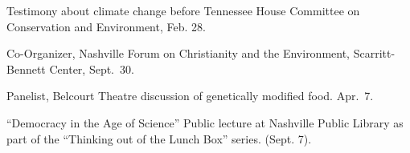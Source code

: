 \item[2008] Testimony about climate change before Tennessee House Committee on
  Conservation and Environment, Feb. 28.
\item[2006] Co-Organizer, Nashville Forum on Christianity and the Environment,
  Scarritt-Bennett Center, Sept.~30.
\item[2006] Panelist, Belcourt Theatre discussion of genetically modified food.
  Apr.~7.
\item[2005] ``Democracy in the Age of Science'' Public lecture at Nashville
  Public Library as part of the ``Thinking out of the Lunch Box'' series.
  (Sept. 7).
